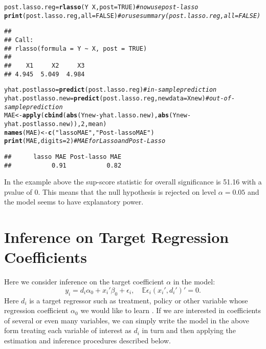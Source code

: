 \documentclass{amsart}\usepackage[]{graphicx}\usepackage[]{color}
\makeatletter
\newcommand{\hlnum}[1]{\textcolor[rgb]{0.686,0.059,0.569}{#1}}%
\newcommand{\hlstr}[1]{\textcolor[rgb]{0.192,0.494,0.8}{#1}}%
\newcommand{\hlcom}[1]{\textcolor[rgb]{0.678,0.584,0.686}{\textit{#1}}}%
\newcommand{\hlopt}[1]{\textcolor[rgb]{0,0,0}{#1}}%
\newcommand{\hlstd}[1]{\textcolor[rgb]{0.345,0.345,0.345}{#1}}%
\newcommand{\hlkwb}[1]{\textcolor[rgb]{0.69,0.353,0.396}{#1}}%
\newcommand{\hlkwc}[1]{\textcolor[rgb]{0.333,0.667,0.333}{#1}}%
\newcommand{\hlkwd}[1]{\textcolor[rgb]{0.737,0.353,0.396}{\textbf{#1}}}%
\newenvironment{kframe}{%
 \def\at@end@of@kframe{}%
 \ifinner\ifhmode%
  \def\at@end@of@kframe{\end{minipage}}%
  \begin{minipage}{\columnwidth}%
 \fi\fi%
 \def\FrameCommand##1{\hskip\@totalleftmargin \hskip-\fboxsep
 \colorbox{shadecolor}{##1}\hskip-\fboxsep
     \hskip-\linewidth \hskip-\@totalleftmargin \hskip\columnwidth}%
 \MakeFramed {\advance\hsize-\width
   \@totalleftmargin\z@ \linewidth\hsize
   \@setminipage}}%
 {\par\unskip\endMakeFramed%
 \at@end@of@kframe}
\newenvironment{knitrout}{}{} %
\makeatother
\begin{document}
\begin{knitrout}
\begin{kframe}
\begin{alltt}
\hlstd{post.lasso.reg} \hlkwb{=} \hlkwd{rlasso}\hlstd{(Y}\hlopt{~}\hlstd{X,}\hlkwc{post}\hlstd{=}\hlnum{TRUE}\hlstd{)} \hlcom{#now use post-lasso}
\hlkwd{print}\hlstd{(post.lasso.reg,} \hlkwc{all}\hlstd{=}\hlnum{FALSE}\hlstd{)}    \hlcom{# or use  summary(post.lasso.reg, all=FALSE) }
\end{alltt}
\begin{verbatim}
## 
## Call:
## rlasso(formula = Y ~ X, post = TRUE)
## 
##    X1     X2     X3  
## 4.945  5.049  4.984
\end{verbatim}
\begin{alltt}
\hlstd{yhat.postlasso} \hlkwb{=} \hlkwd{predict}\hlstd{(post.lasso.reg)}  \hlcom{#in-sample prediction}
\hlstd{yhat.postlasso.new} \hlkwb{=} \hlkwd{predict}\hlstd{(post.lasso.reg,} \hlkwc{newdata}\hlstd{=Xnew)}  \hlcom{#out-of-sample prediction}
\hlstd{MAE}\hlkwb{<-} \hlkwd{apply}\hlstd{(}\hlkwd{cbind}\hlstd{(}\hlkwd{abs}\hlstd{(Ynew}\hlopt{-}\hlstd{yhat.lasso.new),} \hlkwd{abs}\hlstd{(Ynew} \hlopt{-} \hlstd{yhat.postlasso.new)),}\hlnum{2}\hlstd{, mean)}
\hlkwd{names}\hlstd{(MAE)}\hlkwb{<-} \hlkwd{c}\hlstd{(}\hlstr{"lasso MAE"}\hlstd{,} \hlstr{"Post-lasso MAE"}\hlstd{)}
\hlkwd{print}\hlstd{(MAE,} \hlkwc{digits}\hlstd{=}\hlnum{2}\hlstd{)}  \hlcom{# MAE for Lasso and Post-Lasso}
\end{alltt}
\begin{verbatim}
##      lasso MAE Post-lasso MAE 
##           0.91           0.82
\end{verbatim}
\end{kframe}
\end{knitrout}

In the example above the sup-score statistic for overall significance is 51.16 with a pvalue of 0. This means that the null hypothesis is rejected on level $\alpha=0.05$ and the model seems to have explanatory power.

\section{Inference on Target Regression Coefficients}

Here we consider inference on the target coefficient $\alpha$ in the model:
$$
y_i = d_i \alpha_0 + x_i'\beta_0 + \epsilon_i,   \quad \mathbb{E} \epsilon_i (x_i', d_i')' =0.
$$
Here $d_i$ is a target regressor such as treatment, policy or other variable whose regression coefficient $\alpha_0$ we would like to learn \citep{BelloniChernozhukovHansen2011}.  If we are interested in coefficients of several or even many variables, we can simply  write the model in the above form treating each variable of interest as $d_i$ in turn and then applying the estimation and inference procedures described below.
\end{document}
